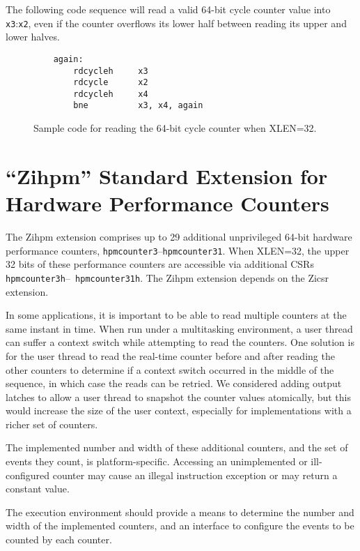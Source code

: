 The following code sequence will read a valid 64-bit cycle counter value into
{\tt x3}:{\tt x2}, even if the counter overflows its lower half between reading its upper
and lower halves.

\begin{figure}[h!]
\begin{center}
\begin{verbatim}
    again:
        rdcycleh     x3
        rdcycle      x2
        rdcycleh     x4
        bne          x3, x4, again
\end{verbatim}
\end{center}
\caption{Sample code for reading the 64-bit cycle counter when XLEN=32.}
\label{rdcycle}
\end{figure}

\section{``Zihpm'' Standard Extension for Hardware Performance Counters}

The Zihpm extension comprises up to 29 additional unprivileged 64-bit
hardware performance counters, {\tt hpmcounter3}--{\tt hpmcounter31}.
When XLEN=32, the upper 32 bits of these performance counters are
accessible via additional CSRs {\tt hpmcounter3h}--{\tt
  hpmcounter31h}.  The Zihpm extension depends on the Zicsr extension.

\begin{commentary}
In some applications, it is important to be able to read multiple
counters at the same instant in time.  When run under a multitasking
environment, a user thread can suffer a context switch while
attempting to read the counters.  One solution is for the user thread
to read the real-time counter before and after reading the other
counters to determine if a context switch occurred in the middle of the
sequence, in which case the reads can be retried.  We considered
adding output latches to allow a user thread to snapshot the counter
values atomically, but this would increase the size of the user
context, especially for implementations with a richer set of counters.
\end{commentary}

The implemented number and width of these additional counters, and the
set of events they count, is platform-specific.  Accessing an
unimplemented or ill-configured counter may cause an illegal
instruction exception or may return a constant value.

The execution environment should provide a means to determine the
number and width of the implemented counters, and an interface to
configure the events to be counted by each counter.

